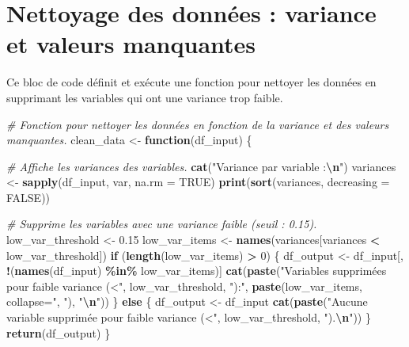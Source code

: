 \documentclass[
]{article}
\newenvironment{Shaded}{\begin{snugshade}}{\end{snugshade}}
\newcommand{\AttributeTok}[1]{\textcolor[rgb]{0.13,0.29,0.53}{#1}}
\newcommand{\CommentTok}[1]{\textcolor[rgb]{0.56,0.35,0.01}{\textit{#1}}}
\newcommand{\ConstantTok}[1]{\textcolor[rgb]{0.56,0.35,0.01}{#1}}
\newcommand{\ControlFlowTok}[1]{\textcolor[rgb]{0.13,0.29,0.53}{\textbf{#1}}}
\newcommand{\DecValTok}[1]{\textcolor[rgb]{0.00,0.00,0.81}{#1}}
\newcommand{\FloatTok}[1]{\textcolor[rgb]{0.00,0.00,0.81}{#1}}
\newcommand{\FunctionTok}[1]{\textcolor[rgb]{0.13,0.29,0.53}{\textbf{#1}}}
\newcommand{\NormalTok}[1]{#1}
\newcommand{\OtherTok}[1]{\textcolor[rgb]{0.56,0.35,0.01}{#1}}
\newcommand{\SpecialCharTok}[1]{\textcolor[rgb]{0.81,0.36,0.00}{\textbf{#1}}}
\newcommand{\StringTok}[1]{\textcolor[rgb]{0.31,0.60,0.02}{#1}}
\begin{document}
\section{Nettoyage des données : variance et valeurs
manquantes}\label{nettoyage-des-donnuxe9es-variance-et-valeurs-manquantes}

Ce bloc de code définit et exécute une fonction pour nettoyer les
données en supprimant les variables qui ont une variance trop faible.

\begin{Shaded}
\begin{Highlighting}[]
\CommentTok{\# Fonction pour nettoyer les données en fonction de la variance et des valeurs manquantes.}
\NormalTok{clean\_data }\OtherTok{\textless{}{-}} \ControlFlowTok{function}\NormalTok{(df\_input) \{}
  
  \CommentTok{\# Affiche les variances des variables.}
  \FunctionTok{cat}\NormalTok{(}\StringTok{"Variance par variable :}\SpecialCharTok{\textbackslash{}n}\StringTok{"}\NormalTok{)}
\NormalTok{  variances }\OtherTok{\textless{}{-}} \FunctionTok{sapply}\NormalTok{(df\_input, var, }\AttributeTok{na.rm =} \ConstantTok{TRUE}\NormalTok{)}
  \FunctionTok{print}\NormalTok{(}\FunctionTok{sort}\NormalTok{(variances, }\AttributeTok{decreasing =} \ConstantTok{FALSE}\NormalTok{))}

  \CommentTok{\# Supprime les variables avec une variance faible (seuil : 0.15).}
\NormalTok{  low\_var\_threshold }\OtherTok{\textless{}{-}} \FloatTok{0.15}
\NormalTok{  low\_var\_items }\OtherTok{\textless{}{-}} \FunctionTok{names}\NormalTok{(variances[variances }\SpecialCharTok{\textless{}}\NormalTok{ low\_var\_threshold])}
  \ControlFlowTok{if}\NormalTok{ (}\FunctionTok{length}\NormalTok{(low\_var\_items) }\SpecialCharTok{\textgreater{}} \DecValTok{0}\NormalTok{) \{}
\NormalTok{    df\_output }\OtherTok{\textless{}{-}}\NormalTok{ df\_input[, }\SpecialCharTok{!}\NormalTok{(}\FunctionTok{names}\NormalTok{(df\_input) }\SpecialCharTok{\%in\%}\NormalTok{ low\_var\_items)]}
    \FunctionTok{cat}\NormalTok{(}\FunctionTok{paste}\NormalTok{(}\StringTok{"Variables supprimées pour faible variance (\textless{}"}\NormalTok{, low\_var\_threshold, }\StringTok{"):"}\NormalTok{, }\FunctionTok{paste}\NormalTok{(low\_var\_items, }\AttributeTok{collapse=}\StringTok{", "}\NormalTok{), }\StringTok{"}\SpecialCharTok{\textbackslash{}n}\StringTok{"}\NormalTok{))}
\NormalTok{  \} }\ControlFlowTok{else}\NormalTok{ \{}
\NormalTok{    df\_output }\OtherTok{\textless{}{-}}\NormalTok{ df\_input}
    \FunctionTok{cat}\NormalTok{(}\FunctionTok{paste}\NormalTok{(}\StringTok{"Aucune variable supprimée pour faible variance (\textless{}"}\NormalTok{, low\_var\_threshold, }\StringTok{").}\SpecialCharTok{\textbackslash{}n}\StringTok{"}\NormalTok{))}
\NormalTok{  \}}
  \FunctionTok{return}\NormalTok{(df\_output)}
\NormalTok{\}}


\end{Highlighting}
\end{Shaded}
\end{document}
